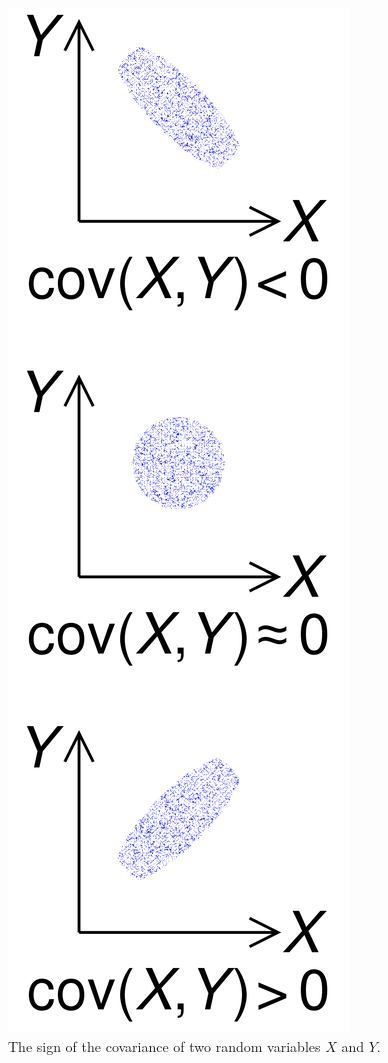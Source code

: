 \begin{figure}[h!]
\begin{center}
	\includegraphics[scale=0.1]{covariance_trends.png}
	\caption[]{The sign of the covariance of two random variables $X$ and $Y$.}
	\label{precisionrecall}
	\end{center}
	\end{figure}

